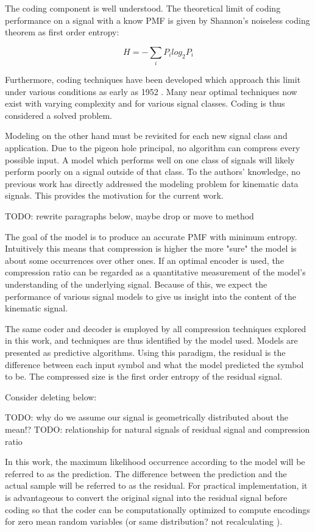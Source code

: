 \documentclass[journal]{IEEEtran}
\begin{document}
The coding component is well understood. The theoretical limit of coding performance on a signal with a know PMF is given by Shannon's noiseless coding theorem\cite{Shannon1948} as first order entropy:

$$H = -\sum_{i} P_ilog_2P_i$$

Furthermore, coding techniques have been developed which approach this limit under various conditions as early as 1952 \cite{Huffman1952}. Many near optimal techniques now exist with varying complexity and for various signal classes. Coding is thus considered a solved problem.

Modeling on the other hand must be revisited for each new signal class and application. Due to the pigeon hole principal, no algorithm can compress every possible input. A model which performs well on one class of signals will likely perform poorly on a signal outside of that class. To the authors' knowledge, no previous work has directly addressed the modeling problem for kinematic data signals. This provides the motivation for the current work.

TODO: rewrite paragraphs below, maybe drop or move to method

The goal of the model is to produce an accurate PMF with minimum entropy. Intuitively this means that compression is higher the more "sure" the model is about some occurrences over other ones. If an optimal encoder is used, the compression ratio can be regarded as a quantitative measurement of the model's understanding of the underlying signal. Because of this, we expect the performance of various signal models to give us insight into the content of the kinematic signal.

The same coder and decoder is employed by all compression techniques explored in this work, and techniques are thus identified by the model used. Models are presented as predictive algorithms. Using this paradigm, the residual is the difference between each input symbol and what the model predicted the symbol to be. The compressed size is the first order entropy of the residual signal.


Consider deleting below:

TODO: why do we assume our signal is geometrically distributed about the mean!?
TODO: relationship for natural signals of residual signal and compression ratio

In this work, the maximum likelihood occurrence according to the model will be referred to as the prediction. The difference between the prediction and the actual sample will be referred to as the residual. For practical implementation, it is advantageous to convert the original signal into the residual signal before coding so that the coder can be computationally optimized to compute encodings for zero mean random variables (or same distribution? not recalculating ).
\end{document}
